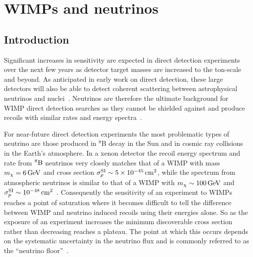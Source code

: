 \chapter{WIMPs and neutrinos}\label{chapter:nufloor}

\section{Introduction}
\label{sec:nufloor_intro}

Significant increases in sensitivity are expected in direct detection experiments over the next few years as detector target masses are increased to the ton-scale and beyond. As anticipated in early work on direct detection, these large detectors will also be able to detect coherent scattering between astrophysical neutrinos and nuclei~\cite{Cabrera:1984rr,Monroe:2007xp,Strigari:2009bq,Gutlein:2010tq}. Neutrinos are therefore the ultimate background for WIMP direct detection searches as they cannot be shielded against and produce recoils with similar rates and energy spectra~\cite{Monroe:2007xp,Strigari:2009bq,Gutlein:2010tq,Billard:2013qya}.

For near-future direct detection experiments the most problematic types of neutrino are those produced in $^8$B decay in the Sun and in cosmic ray collisions in the Earth's atmosphere. In a xenon detector the recoil energy spectrum and rate from ${}^{8}\rm{B}$ neutrinos very closely matches that of a WIMP with mass $m_{\chi}= 6 \, {\rm GeV}$ and cross section $\sigma^{\rm SI}_p \sim 5 \times 10^{-45} \, {\rm cm}^2$, while the spectrum from atmospheric neutrinos is similar to that of a WIMP with $m_{\chi} \sim 100 \, {\rm GeV}$ and  $\sigma^{\rm SI}_p \sim  10^{-48} \, {\rm cm}^2$~\cite{Strigari:2009bq}. Consequently the sensitivity of an experiment to WIMPs reaches a point of saturation where it becomes difficult to tell the difference between WIMP and neutrino induced recoils using their energies alone. So as the exposure of an experiment increases the minimum discoverable cross section rather than decreasing reaches a plateau. The point at which this occurs depends on the systematic uncertainty in the neutrino flux and is commonly referred to as the ``neutrino floor''~\cite{Billard:2013qya}.

